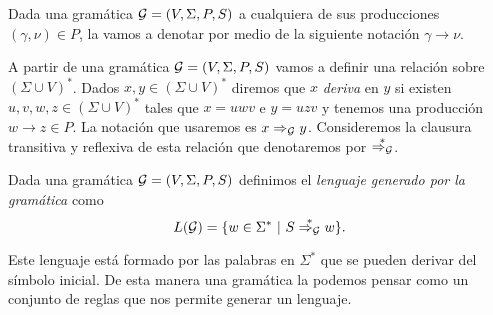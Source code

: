 \documentclass[tesis.tex]{subfiles}
\begin{document}
Dada una gramática ${\cal G} = (V, \Sigma, P, S)$ a cualquiera de sus producciones $(\gamma, \nu) \in P$, la vamos a denotar por medio de la siguiente notación $\gamma \to \nu$. 

A partir de una gramática ${\cal G} = (V, \Sigma, P, S)$ vamos a definir una relación sobre $(\Sigma \cup V)^*$. 
Dados $x,y \in (\Sigma \cup V)^*$ diremos que $x$ \emph{deriva} en $y$ si existen $u,v,w,z \in (\Sigma \cup V)^*$ tales que $x = uwv$ e $y=uzv$ y tenemos una producción $w \to z \in P$.
La notación que usaremos es $x \Rightarrow_{\cal G} y$. 
Consideremos la clausura transitiva y reflexiva de esta relación que denotaremos por $\overset{*}{\Rightarrow_{\cal G}}$.



\begin{deff}
	Dada una gramática ${\cal G} = (V, \Sigma, P, S)$  definimos el \emph{lenguaje generado por la gramática} como
	\[
	L({\cal G}) = \{ w \in \Sigma^* \ | \ S \overset{*}{\Rightarrow_{\cal G}} w   \}.
	\]
\end{deff}

Este lenguaje está formado por las palabras en $\Sigma^*$ que se pueden derivar del símbolo inicial.
De esta manera una gramática la podemos pensar como un conjunto de reglas que nos permite generar un lenguaje. 
 
\end{document}
